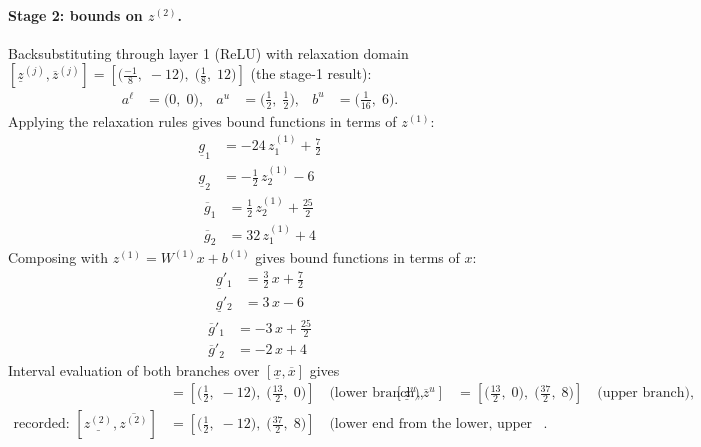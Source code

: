 \documentclass[11pt]{article}
\begin{document}
\paragraph{Stage 2: bounds on $z^{(2)}$.}
Backsubstituting through layer 1 (ReLU) with relaxation domain $[\underline{z}^{(j)}, \overline{z}^{(j)}] = [\bigl(\frac{-1}{8},\; -12\bigr),\; \bigl(\frac{1}{8},\; 12\bigr)]$ (the stage-1 result):
\begin{align*}
a^{\ell} &= \bigl(0,\; 0\bigr), & a^{u} &= \bigl(\frac{1}{2},\; \frac{1}{2}\bigr), & b^{u} &= \bigl(\frac{1}{16},\; 6\bigr).
\end{align*}
Applying the relaxation rules gives bound functions in terms of $z^{(1)}$:
\begin{align*}
\underline{g}_{1} &= -24\,z^{(1)}_{1} + \frac{7}{2} \\
\underline{g}_{2} &= -\frac{1}{2}\,z^{(1)}_{2} - 6
\end{align*}
\begin{align*}
\overline{g}_{1} &= \frac{1}{2}\,z^{(1)}_{2} + \frac{25}{2} \\
\overline{g}_{2} &= 32\,z^{(1)}_{1} + 4
\end{align*}
Composing with $z^{(1)} = W^{(1)} x + b^{(1)}$ gives bound functions in terms of $x$:
\begin{align*}
\underline{g}'_{1} &= \frac{3}{2}\,x + \frac{7}{2} \\
\underline{g}'_{2} &= 3\,x - 6
\end{align*}
\begin{align*}
\overline{g}'_{1} &= -3\,x + \frac{25}{2} \\
\overline{g}'_{2} &= -2\,x + 4
\end{align*}
Interval evaluation of both branches over $[\underline{x}, \overline{x}]$ gives
\begin{align*}
[\underline{z}^{\ell}, \overline{z}^{\ell}] &= [\bigl(\frac{1}{2},\; -12\bigr),\; \bigl(\frac{13}{2},\; 0\bigr)] \quad\text{(lower branch)}, & [\underline{z}^{u}, \overline{z}^{u}] &= [\bigl(\frac{13}{2},\; 0\bigr),\; \bigl(\frac{37}{2},\; 8\bigr)] \quad\text{(upper branch)}, \\
\text{recorded: } [\underline{z^{(2)}}, \overline{z^{(2)}}] &= [\bigl(\frac{1}{2},\; -12\bigr),\; \bigl(\frac{37}{2},\; 8\bigr)] \quad\text{(lower end from the lower, upper end from the upper branch)}.
\end{align*}
\end{document}
